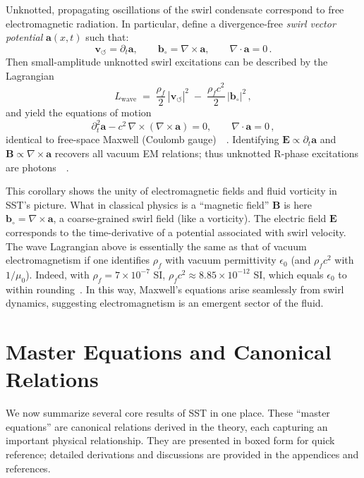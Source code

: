 \documentclass[aps,onecolumn,10pt,nofootinbib]{revtex4}
\newcommand{\swirlarrow}{\circlearrowleft} %
\newcommand{\vswirl}{\mathbf{v}_{\!\swirlarrow}}     %
\begin{document}
	\begin{tcolorbox}[title=Corollary 4.2: Photon as a Swirl Wave]
		Unknotted, propagating oscillations of the swirl condensate correspond to free electromagnetic radiation. In particular, define a divergence-free \emph{swirl vector potential} $\mathbf{a}(x,t)$ such that:
		\[
			\vswirl = \partial_t \mathbf{a}, \qquad
			\mathbf{b}_{\circ} = \nabla \times \mathbf{a}, \qquad
			\nabla\cdot \mathbf{a} = 0\,.
		\]
		Then small-amplitude unknotted swirl excitations can be described by the Lagrangian
		\[
			L_{\text{wave}} \;=\; \frac{\rho_f}{2}\,|\vswirl|^2 \;-\; \frac{\rho_f c^2}{2}\,|\mathbf{b}_{\circ}|^2\,,
		\]
		and yield the equations of motion
		\[
			\partial_t^2 \mathbf{a} - c^2 \,\nabla \times (\nabla \times \mathbf{a}) = 0, \qquad \nabla \cdot \mathbf{a} = 0\,,
		\]
		identical to free-space Maxwell (Coulomb gauge)~\cite{index61}~\cite{index62}. Identifying $\mathbf{E} \propto \partial_t \mathbf{a}$ and $\mathbf{B}\propto \nabla \times \mathbf{a}$ recovers all vacuum EM relations; thus unknotted R-phase excitations are photons~\cite{index63}~\cite{index64}.
	\end{tcolorbox}

	\noindent This corollary shows the unity of electromagnetic fields and fluid vorticity in SST’s picture. What in classical physics is a “magnetic field” $\mathbf{B}$ is here $\mathbf{b}_{\circ} = \nabla\times \mathbf{a}$, a coarse-grained swirl field (like a vorticity). The electric field $\mathbf{E}$ corresponds to the time-derivative of a potential associated with swirl velocity. The wave Lagrangian above is essentially the same as that of vacuum electromagnetism if one identifies $\rho_f$ with vacuum permittivity $\epsilon_0$ (and $\rho_f c^2$ with $1/\mu_0$). Indeed, with $\rho_f = 7\times10^{-7}$ SI, $\rho_f c^2 \approx 8.85\times10^{-12}$ SI, which equals $\epsilon_0$ to within rounding~\cite{index65}. In this way, Maxwell’s equations arise seamlessly from swirl dynamics, suggesting electromagnetism is an emergent sector of the fluid.


	\section{Master Equations and Canonical Relations}
	We now summarize several core results of SST in one place. These “master equations” are canonical relations derived in the theory, each capturing an important physical relationship. They are presented in boxed form for quick reference; detailed derivations and discussions are provided in the appendices and references.
\end{document}
